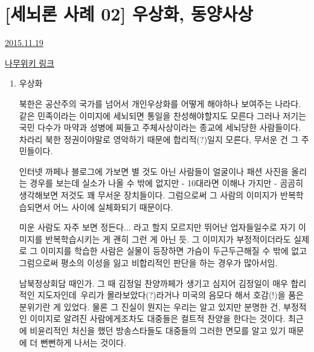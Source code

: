 \section{[세뇌론 사례 02] 우상화, 동양사상}
\href{https://www.kockoc.com/Apoc/499998}{2015.11.19}

\vspace{5mm}

\href{https://namu.mirror.wiki/w/%EB%82%B4%20%EC%99%B8%EB%AA%A8%EC%97%90%20%EB%B0%98%ED%95%B4%20%ED%98%B8%EA%B8%B0%EC%8B%AC%EC%9C%BC%EB%A1%9C%20%EC%A0%84%ED%99%94%ED%96%88%EB%8B%A4%EA%B0%84%20%ED%81%B0%20%ED%98%B8%ED%86%B5%EC%9D%84%20%EB%93%A4%EC%9D%84%20%EA%B2%83%EC%9D%B4%EC%95%BC}{나무위키 링크}

\vspace{5mm}
\begin{enumerate}
\item  우상화
\vspace{5mm}

북한은 공산주의 국가를 넘어서 개인우상화를 어떻게 해야하나 보여주는 나라다.
같은 민족이라는 이미지에 세뇌되면 통일을 찬성해야할지도 모른다
그러나 저기는 국민 다수가 마약과 성병에 찌들고 주체사상이라는 종교에 세뇌당한 사람들이다.
차라리 북한 정권이야말로 영악하기 때문에 합리적(?)일지 모른다, 무서운 건 그 주민들이다.
\vspace{5mm}

인터넷 까페나 블로그에 가보면 별 것도 아닌 사람들이 얼굴이나 패션 사진을 올리는 경우를 보는데
실소가 나올 수 밖에 없지만 - 10대라면 이해나 가지만 - 곰곰히 생각해보면 저것도 꽤 무서운 장치들이다.
그럼으로써 그 사람의 이미지가 반복학습되면서 어느 사이에 실체화되기 때문이다.
\vspace{5mm}

미운 사람도 자주 보면 정든다... 라고 할지 모르지만 뛰어난 업자들일수로 자기 이미지를 반복학습시키는 게 괜히 그런 게 아닌 듯.
그 이미지가 부정적이더라도 실제로 그 이미지를 학습한 사람은 실물이 등장하면 가슴이 두근두근해질 수 밖에 없고
그럼으로써 평소의 이성을 잃고 비합리적인 판단을 하는 경우가 많아서임.
\vspace{5mm}

남북정상회담 때인가. 그 때 김정일 찬양까페가 생기고
심지어 김정일이 매우 합리적인 지도자인데 우리가 몰라보았다(?)라거나 미국의 음모다 해서 호감(!)을 품은 분위기란 게 있었다.
물론 그 진실이 뭔지는 우리는 알고 있지만 분명한 건, 부정적인 이미지로 알려진 사람에게조차도 대중들은 컬트적 찬양을 한다는 것이다.
최근에 비윤리적인 처신을 했던 방송스타들도 대중들의 그러한 면모를 알고 있기 때문에 더 뻔뻔하게 나서는 것이다.
\vspace{5mm}


\end{enumerate}
